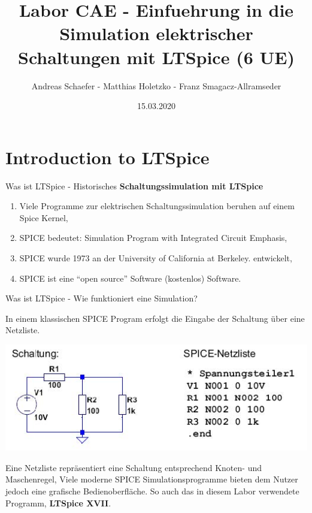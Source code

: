 \documentclass{beamer}
\title{Labor CAE - Einfuehrung in die Simulation elektrischer
Schaltungen mit LTSpice (6 UE)}
\date{15.03.2020}
\author{Andreas Schaefer - Matthias Holetzko - Franz Smagacz-Allramseder}
\institute{Duale Hochschule Baden-Württemberg  \newline -- \newline Fakultät Technik \newline Studiengang Mechatronik}
\begin{document}
  \maketitle
  \section{Introduction to LTSpice}
  
  \begin{frame}{Was ist LTSpice - Historisches}
 \textbf{Schaltungssimulation mit LTSpice}\newline
 \begin{enumerate}
 \item Viele Programme zur elektrischen Schaltungssimulation beruhen auf einem Spice Kernel,
 \item SPICE bedeutet: Simulation Program with Integrated Circuit Emphasis,
 \item SPICE wurde 1973 an der University of California at Berkeley. entwickelt,
 \item SPICE ist eine “open source” Software (kostenlos) Software.
 \end{enumerate}
 \end{frame}
  
 \begin{frame}[fragile]{Was ist LTSpice - Wie funktioniert eine Simulation?}
	
	In einem klassischen SPICE Program erfolgt die Eingabe der Schaltung über eine
	Netzliste.
\begin{center}
\includegraphics[scale=0.5]{pictures/page1.jpg}
\end{center}

	Eine Netzliste repräsentiert eine Schaltung entsprechend Knoten- und Maschenregel, \newline Viele moderne SPICE Simulationsprogramme
	bieten dem Nutzer jedoch eine grafische Bedienoberfläche. 
	So auch das in diesem Labor verwendete Programm, \textbf{LTSpice XVII}. 


  \end{frame}
  
\end{document}
